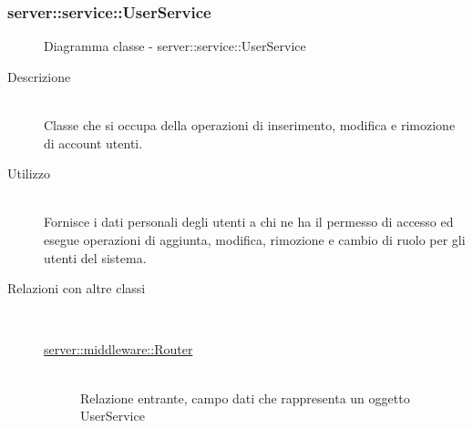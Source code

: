 \subsubsection[UserService]{server::service::UserService}
\begin{figure}[H]
	\centering
	\caption{Diagramma classe - server::service::UserService}
\end{figure}\begin{description}
\item[Descrizione] \hfill \\
Classe che si occupa della operazioni di inserimento, modifica e rimozione di account utenti.
\item[Utilizzo] \hfill \\
Fornisce i dati personali degli utenti a chi ne ha il permesso di accesso ed esegue operazioni di aggiunta, modifica, rimozione e cambio di ruolo per gli utenti del sistema.
\item[Relazioni con altre classi] \hfill \\
\vspace{-7mm}
\begin{description}
	\item[\hyperlink{server::middleware::Router}{server::middleware::Router}] \hfill \\
	Relazione entrante, campo dati che rappresenta un oggetto UserService
\end{description}


\end{description}
